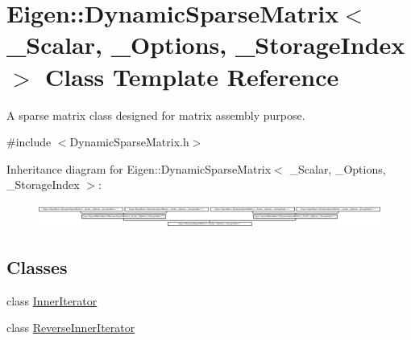 \hypertarget{class_eigen_1_1_dynamic_sparse_matrix}{}\section{Eigen\+:\+:Dynamic\+Sparse\+Matrix$<$ \+\_\+\+Scalar, \+\_\+\+Options, \+\_\+\+Storage\+Index $>$ Class Template Reference}
\label{class_eigen_1_1_dynamic_sparse_matrix}


A sparse matrix class designed for matrix assembly purpose.  




{\ttfamily \#include $<$Dynamic\+Sparse\+Matrix.\+h$>$}

Inheritance diagram for Eigen\+:\+:Dynamic\+Sparse\+Matrix$<$ \+\_\+\+Scalar, \+\_\+\+Options, \+\_\+\+Storage\+Index $>$\+:\begin{figure}[H]
\begin{center}
\leavevmode
\includegraphics[height=0.798479cm]{class_eigen_1_1_dynamic_sparse_matrix}
\end{center}
\end{figure}
\subsection*{Classes}
\begin{DoxyCompactItemize}
\item 
class \hyperlink{class_eigen_1_1_dynamic_sparse_matrix_1_1_inner_iterator}{Inner\+Iterator}
\item 
class \hyperlink{class_eigen_1_1_dynamic_sparse_matrix_1_1_reverse_inner_iterator}{Reverse\+Inner\+Iterator}
\end{DoxyCompactItemize}
